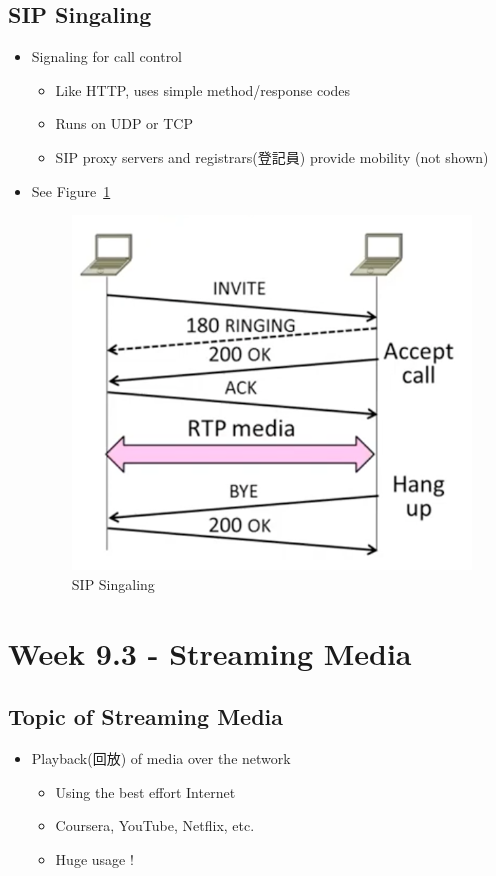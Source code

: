 \documentclass[12pt]{ctexart}   %
\begin{document}
	\subsection{SIP Singaling}
	\begin{itemize}
		\item Signaling for call control
		\begin{itemize}
			\item Like HTTP, uses simple method/response codes
			\item Runs on UDP or TCP
			\item SIP proxy servers and registrars(登記員) provide mobility (not shown)
		\end{itemize}
		\item See Figure~\ref{fig:9-2-10}
		  
		 \begin{figure}[h!] %
		\centering
		 \includegraphics[scale=0.7]{images/9-2-10}
		\caption{ SIP Singaling }
		 \label{fig:9-2-10}
		 \end{figure}
	\end{itemize}
	
\section{Week 9.3 - Streaming Media}
	\subsection{Topic of Streaming Media}
	\begin{itemize}
		\item Playback(回放) of media over the network
		\begin{itemize}
			\item Using the best effort Internet
			\item Coursera, YouTube, Netflix, etc.
			\item Huge usage !
		\end{itemize}
	\end{itemize}
	
\end{document}
